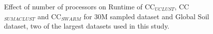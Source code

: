 \documentclass[letterpaper,twocolumn]{article}
\begin{document}
\begin{figure}[t]	
	\begin{minipage}[t]{0.5\linewidth}
	\end{minipage}%
	\hfill%
	\begin{minipage}[t]{0.5\linewidth}
	\end{minipage}	
	\caption{Effect of number of processors on Runtime of CC$_{UCLUST}$, CC$_{SUMACLUST}$ and CC$_{SWARM}$ for 30M sampled dataset and Global Soil dataset, two of the largest datasets used in this study.}
\end{figure}
\end{document}
